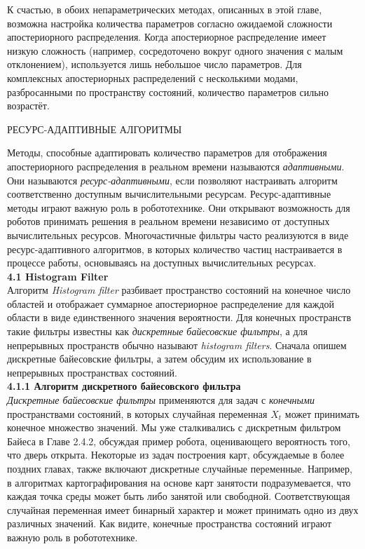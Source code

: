 \documentclass[10pt,a4paper]{article}
\begin{document}
К счастью, в обоих непараметрических методах, описанных в этой главе, возможна настройка количества параметров согласно ожидаемой сложности апостериорного распределения. Когда апостериорное распределение имеет низкую сложность (например, сосредоточено вокруг одного значения с малым отклонением), используется лишь небольшое число параметров. Для комплексных апостериорных распределений с несколькими модами, разбросанными по пространству состояний, количество параметров сильно возрастёт. 

РЕСУРС-АДАПТИВНЫЕ АЛГОРИТМЫ

Методы, способные адаптировать количество параметров для отображения апостериорного распределения в реальном времени называются \textit{адаптивными}. Они называются \textit{ресурс-адаптивными}, если позволяют настраивать алгоритм соответственно доступным вычислительными ресурсам. 
Ресурс-адаптивные методы играют важную роль в робототехнике. Они открывают возможность для роботов принимать решения в реальном времени независимо от доступных вычислительных ресурсов. Многочастичные фильтры часто реализуются в виде ресурс-адаптивного алгоритмов, в которых количество частиц настраивается в процессе работы, основываясь на доступных вычислительных ресурсах.\\

\textbf{4.1 Histogram Filter}\\

Алгоритм \textit{Histogram filter} разбивает пространство состояний на конечное число областей и отображает суммарное апостериорное распределение для каждой области  в виде единственного значения вероятности. Для конечных пространств такие фильтры известны как \textit{дискретные байесовские фильтры}, а для непрерывных пространств обычно называют \textit{histogram filters}. Сначала опишем дискретные байесовские фильтры, а затем обсудим их использование в непрерывных пространствах состояний. \\

\textbf{4.1.1 Алгоритм дискретного байесовского фильтра}\\

\textit{Дискретные байесовские фильтры} применяются для задач с \textit{конечными} пространствами состояний, в которых случайная переменная $X_t$ может принимать конечное множество значений. Мы уже сталкивались с дискретным фильтром Байеса в Главе 2.4.2, обсуждая пример робота, оценивающего вероятность того, что дверь открыта. Некоторые из задач построения карт, обсуждаемые в более поздних главах, также включают дискретные случайные переменные. Например, в алгоритмах картографирования на основе карт занятости подразумевается, что каждая точка среды может быть либо занятой или свободной. Соответствующая случайная переменная имеет бинарный характер и может принимать одно из двух различных значений. Как видите, конечные пространства состояний играют важную роль в робототехнике.  
\end{document}

